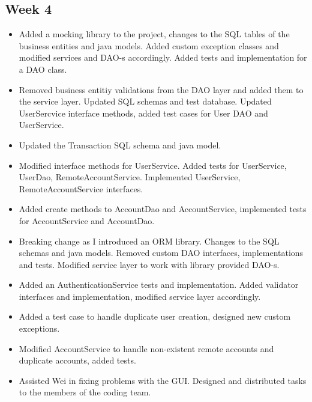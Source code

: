 \documentclass[12pt]{article}
\begin{document}
\subsection*{Week 4}
\begin{itemize}

\item Added a mocking library to the project, changes to the SQL tables of the business entities and java models. Added custom exception classes and modified services and DAO-s accordingly. Added tests and implementation for a DAO class. 

\item Removed business entitiy validations from the DAO layer and added them to the service layer. Updated SQL schemas and test database. Updated UserSercvice interface methods, added test cases for User DAO and UserService.

\item Updated the Transaction SQL schema and java model.

\item Modified interface methods for UserService. Added tests for UserService, UserDao, RemoteAccountService. Implemented UserService, RemoteAccountService interfaces. 

\item Added create methods to AccountDao and AccountService, implemented tests for AccountService and AccountDao. 

\item Breaking change as I introduced an ORM library. Changes to the SQL schemas and java models. Removed custom DAO interfaces, implementations and tests. Modified service layer to work with library provided DAO-s. 

\item Added an AuthenticationService tests and implementation. Added validator interfaces and implementation, modified service layer accordingly. 

\item Added a test case to handle duplicate user creation, designed new custom exceptions. 

\item Modified AccountService to handle non-existent remote accounts and duplicate accounts, added tests. 

\item Assisted Wei in fixing problems with the GUI. Designed and distributed tasks to the members of the coding team. 

\end{itemize}
\end{document}
